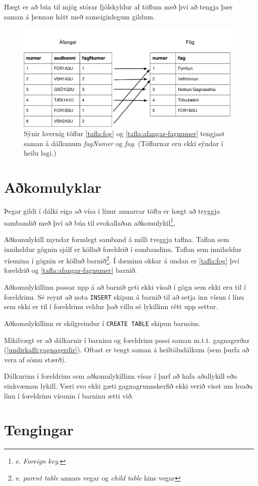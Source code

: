 Hægt er að búa til mjög stórar fjölskyldur af töflum með því að tengja þær saman á þennan hátt með sameiginlegum gildum.

\begin{figure}
\caption[Tengsl taflna]{Sýnir hvernig töflur \ref{tafla:fog} og \ref{tafla:afangar-fagnumer} tengjast saman á dálkunum \emph{fagNumer} og \emph{fag}. (Töflurnar eru ekki sýndar í heilu lagi.)}
\label{mynd:tengsl}
\centering
\includegraphics[width=\linewidth]{myndir/foreign-key}
\end{figure}

\section{Aðkomulyklar} %
Þegar gildi í dálki eiga að vísa í línur annarrar töflu er hægt að tryggja sambandið með því að búa til svokallaðan aðkomulykil\footnote{e. \emph{Foreign key}.}.

Aðkomulykill myndar formlegt samband á milli tveggja taflna. Taflan sem inniheldur gögnin sjálf er kölluð foreldrið í sambandinu. Taflan sem inniheldur vísunina í gögnin er kölluð barnið\footnote{e. \emph{parent table} annars vegar og \emph{child table} hins vegar}. Í dæminu okkar á undan er \ref{tafla:fog} því foreldrið og \ref{tafla:afangar-fagnumer} barnið.

Aðkomulykillinn passar upp á að barnið geti ekki vísað í gögn sem ekki eru til í foreldrinu. Sé reynt að nota \verb|INSERT| skipun á barnið til að setja inn vísun í línu sem ekki er til í foreldrinu veldur það villu sé lykillinn rétt upp settur.

Aðkomulykillinn er skilgreindur í \verb|CREATE TABLE| skipun barnsins.

Mikilvægt er að dálkarnir í barninu og foreldrinu passi saman m.t.t. gagnagerðar (\ref{undirkafli:gagnagerdir}). Oftast er tengt saman á heiltöludálkum (sem þurfa að vera af sömu stærð).

Dálkurinn í foreldrinu sem aðkomulykillinn vísar í þarf að hafa aðallykill eða einkvæman lykill. Væri svo ekki gæti gagnagrunnskerfið ekki verið visst um hvaða línu í foreldrinu vísunin í barninu ætti við.
\section{Tengingar} %







